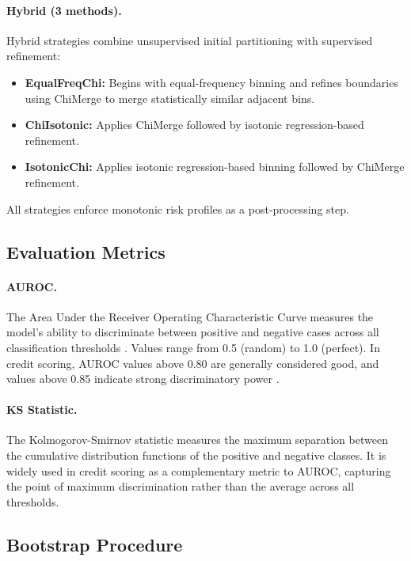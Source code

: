 \documentclass[11pt]{article}
\begin{document}
\paragraph{Hybrid (3 methods).}
Hybrid strategies combine unsupervised initial partitioning with supervised refinement:
\begin{itemize}[nosep]
    \item \textbf{EqualFreqChi:} Begins with equal-frequency binning and refines boundaries using ChiMerge to merge statistically similar adjacent bins.
    \item \textbf{ChiIsotonic:} Applies ChiMerge followed by isotonic regression-based refinement.
    \item \textbf{IsotonicChi:} Applies isotonic regression-based binning followed by ChiMerge refinement.
\end{itemize}

All strategies enforce monotonic risk profiles as a post-processing step.

\subsection{Evaluation Metrics}

\paragraph{AUROC.} The Area Under the Receiver Operating Characteristic Curve measures the model's ability to discriminate between positive and negative cases across all classification thresholds \citep{hanley1982meaning}. Values range from 0.5 (random) to 1.0 (perfect). In credit scoring, AUROC values above 0.80 are generally considered good, and values above 0.85 indicate strong discriminatory power \citep{siddiqi2012credit}.

\paragraph{KS Statistic.} The Kolmogorov-Smirnov statistic \citep{kolmogorov1933sulla, smirnov1948table} measures the maximum separation between the cumulative distribution functions of the positive and negative classes. It is widely used in credit scoring as a complementary metric to AUROC, capturing the point of maximum discrimination rather than the average across all thresholds.

\subsection{Bootstrap Procedure}
\end{document}
